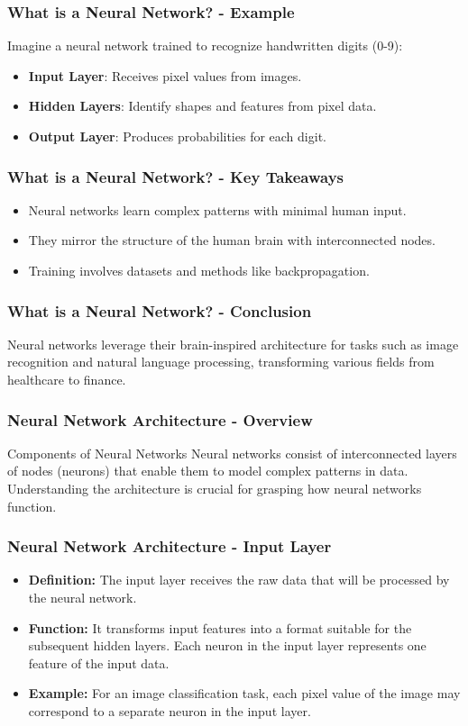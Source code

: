 \documentclass{beamer}
\begin{document}
\begin{frame}[fragile]
    \frametitle{What is a Neural Network? - Example}
    Imagine a neural network trained to recognize handwritten digits (0-9):
    \begin{itemize}
        \item \textbf{Input Layer}: Receives pixel values from images.
        \item \textbf{Hidden Layers}: Identify shapes and features from pixel data.
        \item \textbf{Output Layer}: Produces probabilities for each digit.
    \end{itemize}
\end{frame}

\begin{frame}[fragile]
    \frametitle{What is a Neural Network? - Key Takeaways}
    \begin{itemize}
        \item Neural networks learn complex patterns with minimal human input.
        \item They mirror the structure of the human brain with interconnected nodes.
        \item Training involves datasets and methods like backpropagation.
    \end{itemize}
\end{frame}

\begin{frame}[fragile]
    \frametitle{What is a Neural Network? - Conclusion}
    Neural networks leverage their brain-inspired architecture for tasks such as image recognition and natural language processing, transforming various fields from healthcare to finance.
\end{frame}

\begin{frame}[fragile]
    \frametitle{Neural Network Architecture - Overview}
    \begin{block}{Components of Neural Networks}
        Neural networks consist of interconnected layers of nodes (neurons) that enable them to model complex patterns in data. Understanding the architecture is crucial for grasping how neural networks function.
    \end{block}
\end{frame}

\begin{frame}[fragile]
    \frametitle{Neural Network Architecture - Input Layer}
    \begin{itemize}
        \item \textbf{Definition:} The input layer receives the raw data that will be processed by the neural network.
        \item \textbf{Function:} It transforms input features into a format suitable for the subsequent hidden layers. Each neuron in the input layer represents one feature of the input data.
        \item \textbf{Example:} For an image classification task, each pixel value of the image may correspond to a separate neuron in the input layer.
    \end{itemize}
\end{frame}
\end{document}
